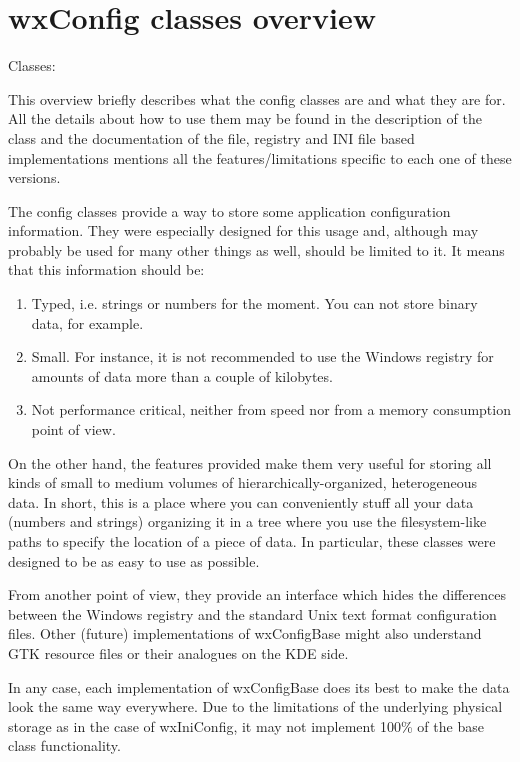 \section{wxConfig classes overview}\label{wxconfigoverview}

Classes: 

This overview briefly describes what the config classes are and what they are
for. All the details about how to use them may be found in the description of
the  class and the documentation of the
file, registry and INI file based implementations mentions all the
features/limitations specific to each one of these versions.

The config classes provide a way to store some application configuration
information. They were especially designed for this usage and, although may
probably be used for many other things as well, should be limited to it. It
means that this information should be:

\begin{enumerate}
\item Typed, i.e. strings or numbers for the moment. You can not store
binary data, for example.
\item Small. For instance, it is not recommended to use the Windows
registry for amounts of data more than a couple of kilobytes.
\item Not performance critical, neither from speed nor from a memory
consumption point of view.
\end{enumerate}

On the other hand, the features provided make them very useful for storing all
kinds of small to medium volumes of hierarchically-organized, heterogeneous
data. In short, this is a place where you can conveniently stuff all your data
(numbers and strings) organizing it in a tree where you use the
filesystem-like paths to specify the location of a piece of data. In
particular, these classes were designed to be as easy to use as possible.

From another point of view, they provide an interface which hides the
differences between the Windows registry and the standard Unix text format
configuration files. Other (future) implementations of wxConfigBase might also
understand GTK resource files or their analogues on the KDE side.

In any case, each implementation of wxConfigBase does its best to
make the data look the same way everywhere. Due
to the limitations of the underlying physical storage as in the case of
wxIniConfig, it may not implement 100\% of the base class functionality.

